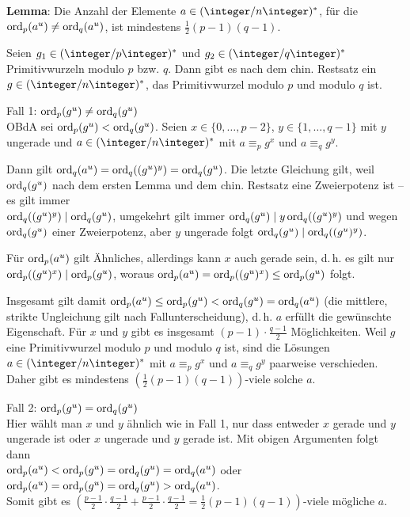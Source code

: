 \linie
\pagebreak

\textbf{Lemma}:
Die Anzahl der Elemente $a \in (\ZnZ)^\ast$, für die $\operatorname{ord}_p(a^u) \not= \operatorname{ord}_q(a^u)$,
ist mindestens $\frac{1}{2} (p-1)(q-1)$.

\begin{Beweis}
    Seien $g_1 \in (\ZpZ)^\ast$ und $g_2 \in (\ZqZ)^\ast$
    Primitivwurzeln modulo $p$ bzw. $q$.
    Dann gibt es nach dem chin. Restsatz ein $g \in (\ZnZ)^\ast$,
    das Primitivwurzel modulo $p$ und modulo $q$ ist.

    Fall 1: $\operatorname{ord}_p(g^u) \not= \operatorname{ord}_q(g^u)$\\
    OBdA sei $\operatorname{ord}_p(g^u) < \operatorname{ord}_q(g^u)$.
    Seien $x \in \{0, \dotsc, p - 2\}$, $y \in \{1, \dotsc, q - 1\}$ mit $y$ ungerade und
    $a \in (\ZnZ)^\ast$ mit $a \equiv_p g^x$ und $a \equiv_q g^y$.

    Dann gilt $\operatorname{ord}_q(a^u) = \operatorname{ord}_q((g^u)^y) = \operatorname{ord}_q(g^u)$.
    Die letzte Gleichung gilt,
    weil $\operatorname{ord}_q(g^u)$ nach dem ersten Lemma und dem chin. Restsatz eine Zweierpotenz ist --
    es gilt immer\\
    $\operatorname{ord}_q((g^u)^y) \mid \operatorname{ord}_q(g^u)$,
    umgekehrt gilt immer
    $\operatorname{ord}_q(g^u) \mid y \operatorname{ord}_q((g^u)^y)$
    und wegen $\operatorname{ord}_q(g^u)$ einer Zweierpotenz, aber $y$ ungerade folgt
    $\operatorname{ord}_q(g^u) \mid \operatorname{ord}_q((g^u)^y)$.

    Für $\operatorname{ord}_p(a^u)$ gilt Ähnliches, allerdings kann $x$ auch gerade sein,
    d.\,h. es gilt nur\\
    $\operatorname{ord}_p((g^u)^x) \mid \operatorname{ord}_p(g^u)$,
    woraus $\operatorname{ord}_p(a^u) = \operatorname{ord}_p((g^u)^x) \le \operatorname{ord}_p(g^u)$ folgt.

    Insgesamt gilt damit $\operatorname{ord}_p(a^u) \le \operatorname{ord}_p(g^u) < \operatorname{ord}_q(g^u) = \operatorname{ord}_q(a^u)$
    (die mittlere, strikte Ungleichung gilt nach Fallunterscheidung),
    d.\,h. $a$ erfüllt die gewünschte Eigenschaft.
    Für $x$ und $y$ gibt es insgesamt $(p-1) \cdot \frac{q-1}{2}$ Möglichkeiten.
    Weil $g$ eine Primitivwurzel modulo $p$ und modulo $q$ ist, sind die Lösungen
    $a \in (\ZnZ)^\ast$ mit $a \equiv_p g^x$ und $a \equiv_q g^y$
    paarweise verschieden.
    Daher gibt es mindestens $(\frac{1}{2} (p-1)(q-1))$-viele solche $a$.

    Fall 2: $\operatorname{ord}_p(g^u) = \operatorname{ord}_q(g^u)$\\
    Hier wählt man $x$ und $y$ ähnlich wie in Fall 1, nur dass entweder
    $x$ gerade und $y$ ungerade ist oder $x$ ungerade und $y$ gerade ist.
    Mit obigen Argumenten folgt dann\\
    $\operatorname{ord}_p(a^u) < \operatorname{ord}_p(g^u) = \operatorname{ord}_q(g^u) = \operatorname{ord}_q(a^u)$ oder
    $\operatorname{ord}_p(a^u) = \operatorname{ord}_p(g^u) = \operatorname{ord}_q(g^u) > \operatorname{ord}_q(a^u)$.\\
    Somit gibt es $(\frac{p-1}{2} \cdot \frac{q-1}{2} + \frac{p-1}{2} \cdot \frac{q-1}{2}
    = \frac{1}{2} (p-1)(q-1))$-viele mögliche $a$.
\end{Beweis}

